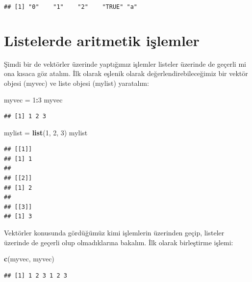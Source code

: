 \documentclass[]{book}
\newenvironment{Shaded}{\begin{snugshade}}{\end{snugshade}}
\newcommand{\DecValTok}[1]{\textcolor[rgb]{0.00,0.00,0.81}{#1}}
\newcommand{\KeywordTok}[1]{\textcolor[rgb]{0.13,0.29,0.53}{\textbf{#1}}}
\newcommand{\NormalTok}[1]{#1}
\newcommand{\OperatorTok}[1]{\textcolor[rgb]{0.81,0.36,0.00}{\textbf{#1}}}
\newcommand{\StringTok}[1]{\textcolor[rgb]{0.31,0.60,0.02}{#1}}
\begin{document}
\begin{verbatim}
## [1] "0"    "1"    "2"    "TRUE" "a"
\end{verbatim}

\hypertarget{listelerde-aritmetik-islemler}{%
\section{Listelerde aritmetik
işlemler}\label{listelerde-aritmetik-islemler}}

Şimdi bir de vektörler üzerinde yaptığımız işlemler listeler üzerinde de
geçerli mi ona kısaca göz atalım. İlk olarak eşlenik olarak
değerlendirebileceğimiz bir vektör objesi (myvec) ve liste objesi
(mylist) yaratalım:

\begin{Shaded}
\begin{Highlighting}[]
\NormalTok{myvec =}\StringTok{ }\DecValTok{1}\OperatorTok{:}\DecValTok{3}
\NormalTok{myvec}
\end{Highlighting}
\end{Shaded}

\begin{verbatim}
## [1] 1 2 3
\end{verbatim}

\begin{Shaded}
\begin{Highlighting}[]
\NormalTok{mylist =}\StringTok{ }\KeywordTok{list}\NormalTok{(}\DecValTok{1}\NormalTok{, }\DecValTok{2}\NormalTok{, }\DecValTok{3}\NormalTok{)}
\NormalTok{mylist}
\end{Highlighting}
\end{Shaded}

\begin{verbatim}
## [[1]]
## [1] 1
## 
## [[2]]
## [1] 2
## 
## [[3]]
## [1] 3
\end{verbatim}

Vektörler konusunda gördüğümüz kimi işlemlerin üzerinden geçip, listeler
üzerinde de geçerli olup olmadıklarına bakalım. İlk olarak birleştirme
işlemi:

\begin{Shaded}
\begin{Highlighting}[]
\KeywordTok{c}\NormalTok{(myvec, myvec)}
\end{Highlighting}
\end{Shaded}

\begin{verbatim}
## [1] 1 2 3 1 2 3
\end{verbatim}
\end{document}
